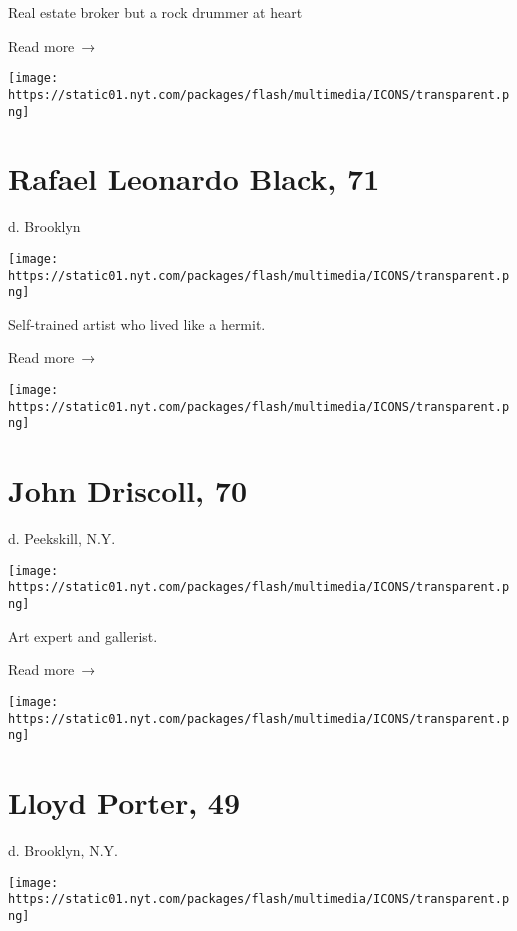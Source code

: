 Real estate broker but a rock drummer at heart

 Read more~→

\href{https://www.nytimes.com/2020/05/23/arts/rafael-leonardo-black-dead-coronavirus.html}{}

\texttt{[image: https://static01.nyt.com/packages/flash/multimedia/ICONS/transparent.png]}

\hypertarget{rafael-leonardo-black-71}{%
\section{Rafael Leonardo Black, 71}\label{rafael-leonardo-black-71}}

d. Brooklyn

\texttt{[image: https://static01.nyt.com/packages/flash/multimedia/ICONS/transparent.png]}

Self-trained artist who lived like a hermit.

 Read more~→

\href{https://www.nytimes.com/2020/05/22/arts/john-driscoll-dead.html}{}

\texttt{[image: https://static01.nyt.com/packages/flash/multimedia/ICONS/transparent.png]}

\hypertarget{john-driscoll-70}{%
\section{John Driscoll, 70}\label{john-driscoll-70}}

d. Peekskill, N.Y.

\texttt{[image: https://static01.nyt.com/packages/flash/multimedia/ICONS/transparent.png]}

Art expert and gallerist.

 Read more~→

\href{https://www.nytimes.com/2020/05/22/obituaries/lloyd-porter-dead-coronavirus.html}{}

\texttt{[image: https://static01.nyt.com/packages/flash/multimedia/ICONS/transparent.png]}

\hypertarget{lloyd-porter-49}{%
\section{Lloyd Porter, 49}\label{lloyd-porter-49}}

d. Brooklyn, N.Y.

\texttt{[image: https://static01.nyt.com/packages/flash/multimedia/ICONS/transparent.png]}

